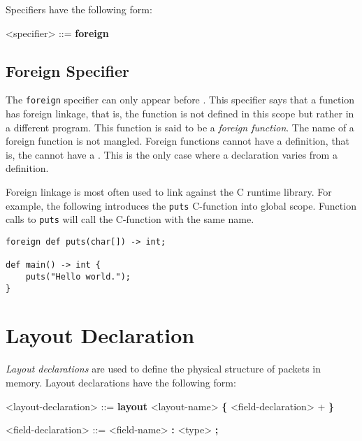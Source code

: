 Specifiers have the following form:

\begin{grammar}
\singlespace
<specifier> ::= \textbf{foreign}
\end{grammar}

\subsection{Foreign Specifier} \label{foreign_spec}

The \texttt{foreign} specifier can only appear before . This specifier says that a function has foreign linkage, that is, the function is not defined in this scope but rather in a different program. This function is said to be a \textit{foreign function}. The name of a foreign function is not mangled. Foreign functions cannot have a definition, that is, the  cannot have a . This is the only case where a declaration varies from a definition.

Foreign linkage is most often used to link against the C runtime library. For example, the following introduces the \texttt{puts} C-function into global scope. Function calls to \texttt{puts} will call the C-function with the same name.

\noindent\begin{minipage}{\linewidth}
\begin{lstlisting}
foreign def puts(char[]) -> int;

def main() -> int {
	puts("Hello world.");
}
\end{lstlisting}
\end{minipage}
 
\section{Layout Declaration} \label{layout_guide}

\textit{Layout declarations} are used to define the physical structure of packets in memory. Layout declarations have the following form:

\begin{minip}
\begin{grammar}
<layout-declaration> ::=
\textbf{layout} <layout-name> 
\textbf{\{}
	<field-declaration> +
\textbf{\}}

<field-declaration> ::=
<field-name> \textbf{:} <type> \textbf{;}
\end{grammar}
\end{minip}

